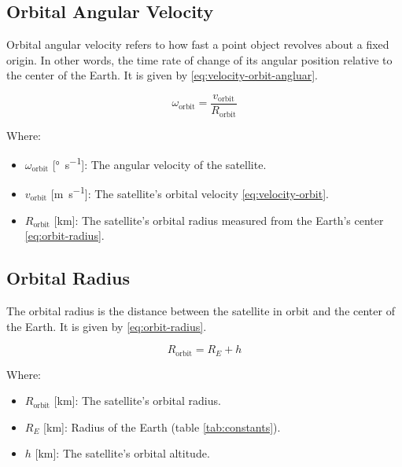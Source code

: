 \documentclass{article}
\begin{document}
\begin{itemize}[label={}]
\subsection{Orbital Angular Velocity}
Orbital angular velocity refers to how fast a point object revolves about a fixed origin. In other words, the time rate of change of its angular position relative to the center of the Earth. It is given by \eqref{eq:velocity-orbit-angluar}.

\begin{equation} \label{eq:velocity-orbit-angluar}
    \omega_{\text{orbit}} = \frac{v_{\text{orbit}}}{R_{\text{orbit}}}
\end{equation}

Where:
\begin{itemize}[label={}]
    \item $\omega_{\text{orbit}}$ [\si{\degree\per\s}]: The angular velocity of the satellite.
    \item $v_{\text{orbit}}$ [\si{\m\per\s}]: The satellite's orbital velocity \eqref{eq:velocity-orbit}.
    \item $R_{\text{orbit}}$ [\si{\km}]: The satellite's orbital radius measured from the Earth's center \eqref{eq:orbit-radius}.
\end{itemize}


\subsection{Orbital Radius}
The orbital radius is the distance between the satellite in orbit and the center of the Earth. It is given by \eqref{eq:orbit-radius}.

\begin{equation} \label{eq:orbit-radius}
    R_{\text{orbit}} = R_E + h
\end{equation}

Where:
\begin{itemize}[label={}]
    \item $R_{\text{orbit}}$ [\si{\km}]: The satellite's orbital radius.
    \item $R_E$ [\si{\km}]: Radius of the Earth (table \ref{tab:constants}).
    \item $h$ [\si{\km}]: The satellite's orbital altitude.
\end{itemize}

\end{itemize}
\printbibliography


\end{document}

